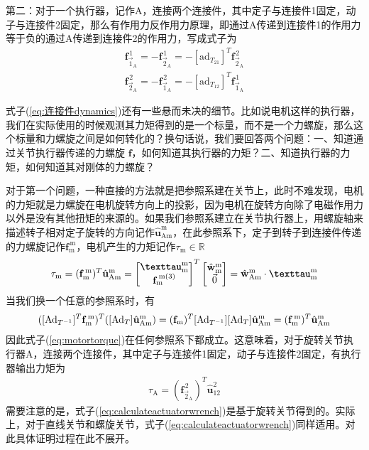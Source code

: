 \documentclass[12pt, a4paper, article, UTF8]{ctexart}
\begin{document}
第二：对于一个执行器，记作A，连接两个连接件，其中定子与连接件1固定，动子与连接件2固定，那么有作用力反作用力原理，即通过A传递到连接件1的作用力等于负的通过A传递到连接件2的作用力，写成式子为
\begin{align}
\mathbf{f}_{\vec{1}_{\text{A}}}^{\,1} = -\mathbf{f}_{\vec{2}_{\text{A}}}^{\,1} =- [\text{ad}_{T_{21}}]^T \mathbf{f}_{\vec{2}_{\text{A}}}^{\,2} \\
\mathbf{f}_{\vec{2}_{\text{A}}}^{\,2} = -\mathbf{f}_{\vec{1}_{\text{A}}}^{\,2} =- [\text{ad}_{T_{12}}]^T \mathbf{f}_{\vec{1}_{\text{A}}}^{\,1}
\end{align}

式子(\ref{eq:连接件dynamics})还有一些悬而未决的细节。比如说电机这样的执行器，我们在实际使用的时候观测其力矩得到的是一个标量，而不是一个力螺旋，那么这个标量和力螺旋之间是如何转化的？换句话说，我们要回答两个问题：一、知道通过关节执行器传递的力螺旋 $\mathbf{f}$，如何知道其执行器的力矩？二、知道执行器的力矩，如何知道其对刚体的力螺旋？

对于第一个问题，一种直接的方法就是把参照系建在关节上，此时不难发现，电机的力矩就是力螺旋在电机旋转方向上的投影，因为电机在旋转方向除了电磁作用力以外是没有其他扭矩的来源的。如果我们参照系建立在关节执行器上，用螺旋轴来描述转子相对定子旋转的方向记作$\hat{\mathbf{u}}_\text{Am}^{\text{m}}$，在此参照系下，定子到转子到连接件传递的力螺旋记作$\mathbf{f}_\text{m}^{\,\text{m}}$，电机产生的力矩记作$\tau_\text{m}\in \mathbb{R}$
\begin{align}
\tau_\text{m} = (\mathbf{f}_\text{\text{m}}^{\,\text{m}})^T  \hat{\mathbf{u}}_\text{Am}^{\text{m}} = \begin{bmatrix}
\textbf{\texttau}_\text{m}^{\text{m}} \\ \mathbf{f}_\text{m}^{\,\text{m}(3)} 
\end{bmatrix}^T \begin{bmatrix}
\hat{\mathbf{w}}^{\text{m}}_{\text{m}} \\ \vec{0}
\end{bmatrix}
 = \hat{\mathbf{w}}_\text{Am}^{\text{m}} \cdot \textbf{\texttau}_\text{m}^{\text{m}} \label{eq:motortorque}
\end{align}
当我们换一个任意的参照系时，有
\begin{align}
([\text{Ad}_{T^{-1}}]^T \mathbf{f}_\text{\text{m}}^{\,\text{m}})^T  ([\text{Ad}_{T}] \hat{\mathbf{u}}_\text{Am}^{\text{m}}) = (\mathbf{f}_\text{m})^T  [\text{Ad}_{T^{-1}}] [\text{Ad}_{T}] \hat{\mathbf{u}}_\text{Am}^{\text{m}} = (\mathbf{f}_\text{m}^{\,\text{m}})^T  \hat{\mathbf{u}}_\text{Am}^{\text{m}} \label{eq:motortorquechangeframe}
\end{align}
因此式子(\ref{eq:motortorque})在任何参照系下都成立。这意味着，对于旋转关节执行器A，连接两个连接件，其中定子与连接件1固定，动子与连接件2固定，有执行器输出力矩为
\begin{align}
\tau_\text{A} = (\mathbf{f}_{\vec{2}_{\text{A}}}^{\,2})^T \hat{\mathbf{u}}_{12}^{2} \label{eq:calculateactuatorwrench}
\end{align}
需要注意的是，式子(\ref{eq:calculateactuatorwrench})是基于旋转关节得到的。实际上，对于直线关节和螺旋关节，式子(\ref{eq:calculateactuatorwrench})同样适用。对此具体证明过程在此不展开。
\end{document}
